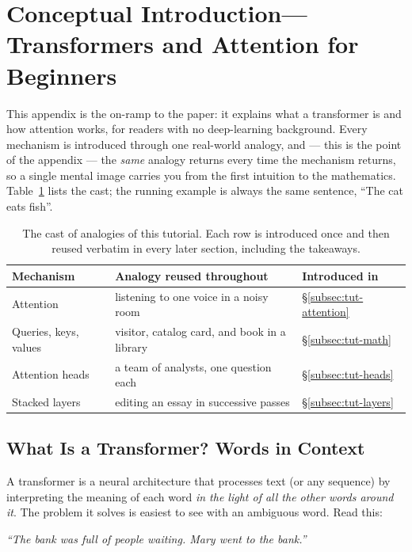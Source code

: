 \section{Conceptual Introduction---Transformers and Attention for Beginners}
\label{sec:annex-tutorial}

This appendix is the on-ramp to the paper: it explains what a transformer is and how attention works, for readers with no deep-learning background. Every mechanism is introduced through one real-world analogy, and --- this is the point of the appendix --- the \emph{same} analogy returns every time the mechanism returns, so a single mental image carries you from the first intuition to the mathematics. Table~\ref{tab:tut-analogies} lists the cast; the running example is always the same sentence, ``The cat eats fish''.

\begin{table}[H]
\centering
\begin{tabular}{@{}lll@{}}
\toprule
\textbf{Mechanism} & \textbf{Analogy reused throughout} & \textbf{Introduced in}\\
\midrule
Attention & listening to one voice in a noisy room & \S\ref{subsec:tut-attention}\\
Queries, keys, values & visitor, catalog card, and book in a library & \S\ref{subsec:tut-math}\\
Attention heads & a team of analysts, one question each & \S\ref{subsec:tut-heads}\\
Stacked layers & editing an essay in successive passes & \S\ref{subsec:tut-layers}\\
\bottomrule
\end{tabular}
\caption{The cast of analogies of this tutorial. Each row is introduced once and then reused verbatim in every later section, including the takeaways.}
\label{tab:tut-analogies}
\end{table}

\subsection{What Is a Transformer? Words in Context}
\label{subsec:tut-context}

A transformer is a neural architecture that processes text (or any sequence) by interpreting the meaning of each word \emph{in the light of all the other words around it}. The problem it solves is easiest to see with an ambiguous word. Read this:

\begin{center}
\textit{``The bank was full of people waiting. Mary went to the bank.''}
\end{center}

